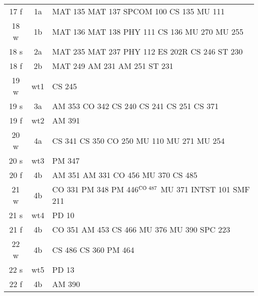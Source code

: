 \documentclass[convert]{standalone}
\newcommand{\opt}[1]{{\color{gray!50}#1}}
\newcommand{\opw}[1]{{\color{white}#1}}
\begin{document}
\begin{tabular}{|c | c | l |}
	\hline
	17 f & 1a & MAT 135 \quad MAT 137 \quad SPCOM 100 \quad CS 135 \quad MU 111 \\
	18 w & 1b & MAT 136 \quad MAT 138 \quad PHY 111 \quad CS 136 \quad MU 270 \quad MU 255\\
	18 s & 2a & MAT 235 \quad MAT 237 \quad PHY 112 \quad ES 202R \quad CS 246 \quad ST  230 \\
	18 f & 2b & MAT 249 \quad AM 231 \quad AM 251 \quad ST  231 \\
	19 w & wt1 & CS 245 \\
	19 s & 3a & AM 353 \quad CO 342 \quad CS 240 \quad CS 241 \quad CS 251 \quad CS 371 \\
	19 f & wt2 & AM 391 \\
	20 w & 4a & CS 341 \quad CS 350 \quad CO 250  \quad MU 110 \quad MU 271 \quad MU 254 \\
	20 s & wt3 & PM 347 \\
	20 f & 4b & AM 351 \quad AM 331   \quad CO 456 \quad MU 370 \quad CS 485 \\
	21 w & 4b &  CO 331 \quad PM 348  \quad PM 446$^{\text{\scriptsize CO 487}}$  \opw{MU 371}  \quad INTST 101 \quad SMF 211 \\
	21 s & wt4 & PD 10  \\
	21 f & 4b & CO 351  \quad AM 453 \quad CS 466 \quad MU 376 \quad MU 390 \quad SPC 223    \\
	22 w & 4b & CS 486 \quad CS 360 \quad PM 464    \\
	22 s & wt5 & PD 13 \\
	22 f & 4b &  \opt{AM 390}   \\\hline

\end{tabular}
\end{document}
